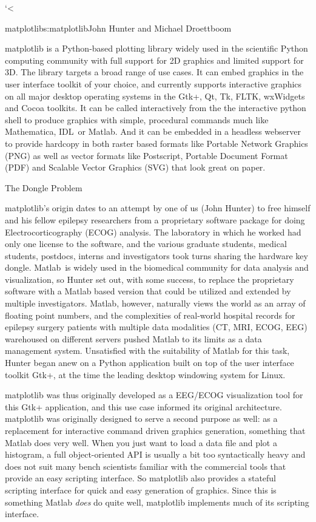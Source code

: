 `<\begin{aosachapter}{matplotlib}{s:matplotlib}{John Hunter and Michael Droettboom}

matplotlib is a Python-based plotting library widely used in the
scientific Python computing community with full support for 2D
graphics and limited support for 3D.  The library targets a broad
range of use cases.  It can embed graphics in the user interface
toolkit of your choice, and currently supports interactive graphics on
all major desktop operating systems in the Gtk+, Qt, Tk, FLTK,
wxWidgets and Cocoa toolkits.  It can be called interactively from the
the interactive python shell to produce graphics with simple,
procedural commands much like Mathematica\texttrademark,
IDL\texttrademark\ or Matlab\texttrademark.  And it can be embedded in
a headless webserver to provide hardcopy in both raster based formats
like Portable Network Graphics (PNG) as well as vector formats like
Postscript, Portable Document Format (PDF) and Scalable Vector
Graphics (SVG) that look great on paper.

\begin{aosasect1}{The Dongle Problem}

matplotlib's origin dates to an attempt by one of us (John Hunter) to
free himself and his fellow epilepsy researchers from a proprietary
software package for doing Electrocorticography (ECOG) analysis.  The
laboratory in which he worked had only one license to the software,
and the various graduate students, medical students, postdocs, interns
and investigators took turns sharing the hardware key dongle.
Matlab\texttrademark\ is widely used in the biomedical community for
data analysis and visualization, so Hunter set out, with some success,
to replace the proprietary software with a Matlab based version that
could be utilized and extended by multiple investigators.  Matlab,
however, naturally views the world as an array of floating point
numbers, and the complexities of real-world hospital records for
epilepsy surgery patients with multiple data modalities (CT, MRI,
ECOG, EEG) warehoused on different servers pushed Matlab to its limits
as a data management system.  Unsatisfied with the suitability of
Matlab for this task, Hunter began anew on a Python application built
on top of the user interface toolkit Gtk+, at the time the leading
desktop windowing system for Linux.

matplotlib was thus originally developed as a EEG/ECOG visualization
tool for this Gtk+ application, and this use case informed its
original architecture.  matplotlib was originally designed to serve a
second purpose as well: as a replacement for interactive command
driven graphics generation, something that Matlab does very well.
When you just want to load a data file and plot a histogram, a full
object-oriented API is usually a bit too syntactically heavy and does
not suit many bench scientists familiar with the commercial tools that
provide an easy scripting interface.  So matplotlib also provides a
stateful scripting interface for quick and easy generation of
graphics.  Since this is something Matlab \emph{does} do quite well,
matplotlib implements much of its scripting interface.


\end{aosasect1}
\end{aosachapter}
